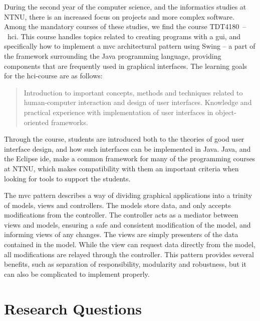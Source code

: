 During the second year of the computer science, and the informatics studies at NTNU, there is an increased focus on projects and more complex software.
Among the mandatory courses of these studies, we find the course TDT4180~--~\gls{hci}.
This course handles topics related to creating programs with a \gls{gui}, and specifically how to implement a \gls{mvc} architectural pattern using Swing -- a part of the framework surrounding the Java programming language, providing components that are frequently used in graphical interfaces.
The learning goals for the \gls{hci}-course are as follows:
\begin{quote}
Introduction to important concepts, methods and techniques related to human-computer interaction and design of user interfaces.
Knowledge and practical experience with implementation of user interfaces in object-oriented frameworks.
\end{quote}
Through the course, students are introduced both to the theories of good user interface design, and how such interfaces can be implemented in Java.
Java, and the Eclipse \gls{ide}, make a common framework for many of the programming courses at NTNU, which makes compatibility with them an important criteria when looking for tools to support the students.

The \gls{mvc} pattern describes a way of dividing graphical applications into a trinity of models, views and controllers.
The models store data, and only accepts modifications from the controller.
The controller acts as a mediator between views and models, ensuring a safe and consistent modification of the model, and informing views of any changes.
The views are simply presenters of the data contained in the model.
While the view can request data directly from the model, all modifications are relayed through the controller.
This pattern provides several benefits, such as separation of responsibility, modularity and robustness, but it can also be complicated to implement properly.

%

\section{Research Questions}\label{intro-RQs}

